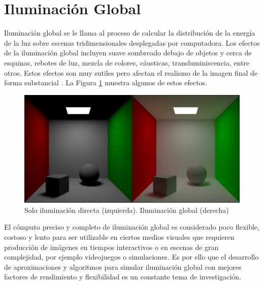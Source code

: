 \section{Iluminación Global}

Iluminación global se le llama al proceso de calcular la distribución de la energía de la luz sobre escenas tridimensionales desplegadas por computadora. Los efectos de la iluminación global incluyen suave sombreado debajo de objetos y cerca de esquinas, rebotes de luz, mezcla de colores, cáusticas, transluminiscencia, entre otros. Estos efectos son muy sutiles pero afectan el realismo de la imagen final de forma substancial \cite{pixar_renderman_intro}. La Figura \ref{fig:gi_comparison} muestra algunos de estos efectos.

\begin{figure}[H]
	\centering
	\includegraphics[width=0.985\linewidth]{media/direct_vs_indirect.png}
	\caption{Solo iluminación directa (izquierda). Iluminación global (derecha)}
	\label{fig:gi_comparison}
\end{figure}

El cómputo preciso y completo de iluminación global es considerado poco flexible, costoso y lento para ser utilizable en ciertos medios visuales que requieren producción de imágenes en tiempos interactivos o en escenas de gran complejidad, por ejemplo videojuegos o simulaciones. Es por ello que el desarrollo de aproximaciones y algoritmos para simular iluminación global con mejores factores de rendimiento y flexibilidad es un constante tema de investigación.
